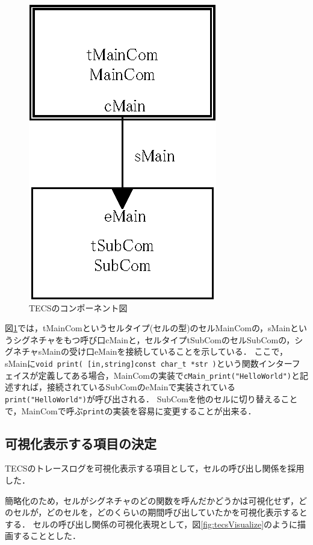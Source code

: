\begin{figure}[t]
\begin{center}
\includegraphics[scale=0.8]{img/tecsSample.eps}
\caption{TECSのコンポーネント図}
\label{fig:tecsSample}
\end{center}
\end{figure}

図\ref{fig:tecsSample}では，tMainComというセルタイプ(セルの型)のセルMainComの，sMainというシグネチャをもつ呼び口cMainと，セルタイプtSubComのセルSubComの，シグネチャsMainの受け口eMainを接続していることを示している．
ここで，sMainに{\tt void print( [in,string]const char\_t *str )}という関数インターフェイスが定義してある場合，MainComの実装で{\tt cMain\_print("HelloWorld")}と記述すれば，接続されているSubComのeMainで実装されている{\tt print("HelloWorld")}が呼び出される．
SubComを他のセルに切り替えることで，MainComで呼ぶ{\tt print}の実装を容易に変更することが出来る．

\subsection{可視化表示する項目の決定}
\label{subsec431}

TECSのトレースログを可視化表示する項目として，セルの呼び出し関係を採用した．

簡略化のため，セルがシグネチャのどの関数を呼んだかどうかは可視化せず，どのセルが，どのセルを，どのくらいの期間呼び出していたかを可視化表示するとする．
セルの呼び出し関係の可視化表現として，図\ref{fig:tecsVisualize}のように描画することとした．

